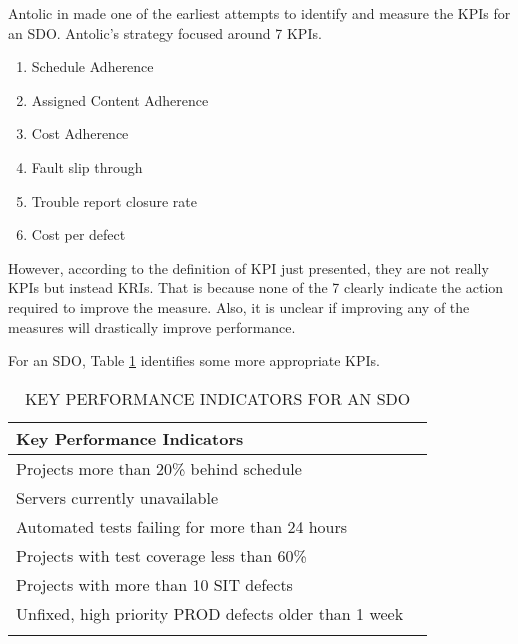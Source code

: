 \documentclass[SDSUThesis.tex]{subfiles}
\begin{document}
            Antolic in \cite{Antolic2008} made one of the earliest attempts
            to identify and measure the KPIs for an SDO. Antolic's strategy
            focused around 7 KPIs.
            \begin{enumerate}
                \item Schedule Adherence
                \item Assigned Content Adherence
                \item Cost Adherence
                \item Fault slip through
                \item Trouble report closure rate
                \item Cost per defect
            \end{enumerate}
            However, according to the definition of KPI just presented,
            they are not really KPIs but instead KRIs.  That is because
            none of the 7 clearly indicate the action required to 
            improve the measure.  Also, it is unclear if improving any of
            the measures will drastically improve performance.
            
            For an SDO, Table \ref{tab:KPI} identifies some more appropriate
            KPIs.  
            
            \begin{longtable}{@{}l l}
                \toprule%
                 \centering%
                 {\bfseries Key Performance Indicators} &
                 \\
                
                \cmidrule[0.4pt](r{0.125em}){1-1}%
                \endhead
                
                Projects more than 20\% behind schedule \\
                \myrowcolour%
                Servers currently unavailable \\
                Automated tests failing for more than 24 hours \\
                \myrowcolour%
                Projects with test coverage less than 60\% \\
                Projects with more than 10 SIT defects \\
                \myrowcolour%
                Unfixed, high priority PROD defects older than 1 week  \\
                
                \bottomrule
                
                \caption{KEY PERFORMANCE INDICATORS FOR AN SDO}
                \label{tab:KPI}
            \end{longtable}
    
\end{document}
